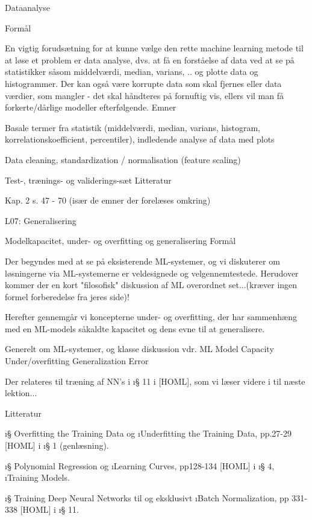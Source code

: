 {Dataanalyse

Formål

En vigtig forudsætning for at kunne vælge den rette machine learning metode til at løse et problem er data analyse, dvs. at få en forståelse af data ved at se på statistikker såsom middelværdi, median, varians, .. og plotte data og histogrammer. Der kan også være korrupte data som skal fjernes eller data værdier, som mangler - det skal håndteres på fornuftig vis, ellers vil man få forkerte/dårlige modeller efterfølgende.
Emner

Basale termer fra statistik (middelværdi, median, varians, histogram, korrelationskoefficient, percentiler), indledende analyse af data med plots

Data cleaning, standardization / normalisation (feature scaling)

Test-, trænings- og validerings-sæt
Litteratur

Kap. 2  s. 47 - 70 (især de emner der forelæses omkring) 





L07: Generalisering 

Modelkapacitet, under- og overfitting og generalisering
Formål

Der begyndes med at se på eksisterende ML-systemer, og vi diskuterer om
løsningerne via ML-systemerne er veldesignede og velgennemtestede.  Herudover
kommer der en kort "filosofisk" diskussion af ML overordnet set...(kræver ingen
formel forberedelse fra jeres side)!

Herefter gennemgår vi koncepterne under- og overfitting, der har sammenhæng med
en ML-models såkaldte kapacitet og dens evne til at generalisere.

    Generelt om ML-systemer, og klasse diskussion vdr. ML
    Model Capacity
    Under/overfitting
    Generalization Error

Der relateres til træning af NN's i \i{§ 11} i [HOML], som vi læser videre i til
næste lektion...  

Litteratur

\i{§ Overfitting the Training Data} og \i{Underfitting the Training Data},
pp.27-29 [HOML] i \i{§ 1} (genlæsning).

\i{§ Polynomial Regression} og \i{Learning Curves}, pp128-134 [HOML] i \i{§
4}, \i{Training Models}.

\i{§ Training Deep Neural Networks} til og eksklusivt \i{Batch Normalization},
pp 331-338 [HOML] i \i{§ 11}.

}
